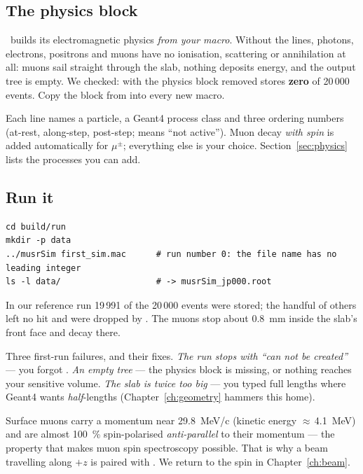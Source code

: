 \subsection{The physics block}
\label{sec:physicsblock}
\begin{pitfall}
\musrSim\ builds its electromagnetic physics \emph{from your macro}. Without the  lines, photons, electrons, positrons and muons have no ionisation, scattering or annihilation at all: muons sail straight through the slab, nothing deposits energy, and the output tree is empty. We checked:  with the physics block removed stores \textbf{zero} of 20\,000 events. Copy the block from  into every new macro.
\end{pitfall}

Each  line names a particle, a Geant4 process class and three ordering numbers (at-rest, along-step, post-step;  means ``not active''). Muon decay \emph{with spin} is added automatically for \(\mu^\pm\); everything else is your choice. Section~\ref{sec:physics} lists the processes you can add.

\subsection{Run it}
\begin{lstlisting}[style=sh,caption={Run your first macro}]
cd build/run
mkdir -p data
../musrSim first_sim.mac      # run number 0: the file name has no leading integer
ls -l data/                   # -> musrSim_jp000.root
\end{lstlisting}

In our reference run 19\,991 of the 20\,000 events were stored; the handful of others left no hit and were dropped by . The muons stop about \SI{0.8}{mm} inside the slab's front face and decay there.

\begin{pitfall}
Three first-run failures, and their fixes. \emph{The run stops with ``can not be created''} --- you forgot . \emph{An empty tree} --- the physics block is missing, or nothing reaches your sensitive volume. \emph{The slab is twice too big} --- you typed full lengths where Geant4 wants \emph{half}-lengths (Chapter~\ref{ch:geometry} hammers this home).
\end{pitfall}

\begin{physics}
Surface muons carry a momentum near \SI{29.8}{MeV/c} (kinetic energy \(\approx\)\,\SI{4.1}{MeV}) and are almost \SI{100}{\percent} spin-polarised \emph{anti-parallel} to their momentum --- the property that makes muon spin spectroscopy possible. That is why a beam travelling along \(+z\) is paired with . We return to the spin in Chapter~\ref{ch:beam}.
\end{physics}


